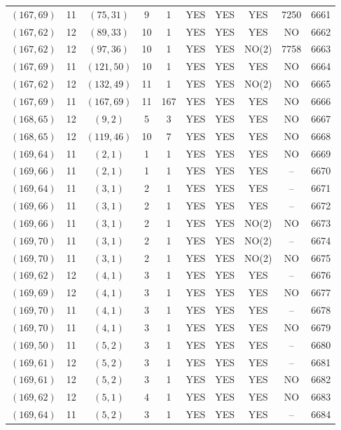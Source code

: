 \begin{longtable}{|c|c|c|c|c|c|c|c|c|c|}
$(167, 69)$ & 11 & $(75, 31)$ & 9 & 1 & YES & YES & YES & 7250 & 6661\\
$(167, 62)$ & 12 & $(89, 33)$ & 10 & 1 & YES & YES & YES & NO & 6662\\
$(167, 62)$ & 12 & $(97, 36)$ & 10 & 1 & YES & YES & NO(2) & 7758 & 6663\\
$(167, 69)$ & 11 & $(121, 50)$ & 10 & 1 & YES & YES & YES & NO & 6664\\
$(167, 62)$ & 12 & $(132, 49)$ & 11 & 1 & YES & YES & NO(2) & NO & 6665\\
$(167, 69)$ & 11 & $(167, 69)$ & 11 & 167 & YES & YES & YES & NO & 6666\\
$(168, 65)$ & 12 & $(9, 2)$ & 5 & 3 & YES & YES & YES & NO & 6667\\
$(168, 65)$ & 12 & $(119, 46)$ & 10 & 7 & YES & YES & YES & NO & 6668\\
$(169, 64)$ & 11 & $(2, 1)$ & 1 & 1 & YES & YES & YES & NO & 6669\\
$(169, 66)$ & 11 & $(2, 1)$ & 1 & 1 & YES & YES & YES & -- & 6670\\
$(169, 64)$ & 11 & $(3, 1)$ & 2 & 1 & YES & YES & YES & -- & 6671\\
$(169, 66)$ & 11 & $(3, 1)$ & 2 & 1 & YES & YES & YES & -- & 6672\\
$(169, 66)$ & 11 & $(3, 1)$ & 2 & 1 & YES & YES & NO(2) & NO & 6673\\
$(169, 70)$ & 11 & $(3, 1)$ & 2 & 1 & YES & YES & NO(2) & -- & 6674\\
$(169, 70)$ & 11 & $(3, 1)$ & 2 & 1 & YES & YES & NO(2) & NO & 6675\\
$(169, 62)$ & 12 & $(4, 1)$ & 3 & 1 & YES & YES & YES & -- & 6676\\
$(169, 69)$ & 12 & $(4, 1)$ & 3 & 1 & YES & YES & YES & NO & 6677\\
$(169, 70)$ & 11 & $(4, 1)$ & 3 & 1 & YES & YES & YES & -- & 6678\\
$(169, 70)$ & 11 & $(4, 1)$ & 3 & 1 & YES & YES & YES & NO & 6679\\
$(169, 50)$ & 11 & $(5, 2)$ & 3 & 1 & YES & YES & YES & -- & 6680\\
$(169, 61)$ & 12 & $(5, 2)$ & 3 & 1 & YES & YES & YES & -- & 6681\\
$(169, 61)$ & 12 & $(5, 2)$ & 3 & 1 & YES & YES & YES & NO & 6682\\
$(169, 62)$ & 12 & $(5, 1)$ & 4 & 1 & YES & YES & YES & NO & 6683\\
$(169, 64)$ & 11 & $(5, 2)$ & 3 & 1 & YES & YES & YES & -- & 6684\\

\end{longtable}
